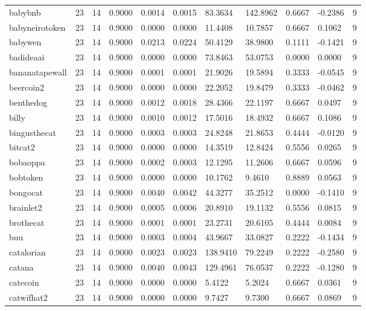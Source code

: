 \begin{table}[htbp]
\begin{tabular}{lllllllllll}
babybnb & 23 & 14 & 0.9000 & 0.0014 & 0.0015 & 83.3634 & 142.8962 & 0.6667 & -0.2386 & 9 \\
babyneirotoken & 23 & 14 & 0.9000 & 0.0000 & 0.0000 & 11.4408 & 10.7857 & 0.6667 & 0.1062 & 9 \\
babywen & 23 & 14 & 0.9000 & 0.0213 & 0.0224 & 50.4129 & 38.9800 & 0.1111 & -0.1421 & 9 \\
badideaai & 23 & 14 & 0.9000 & 0.0000 & 0.0000 & 73.8463 & 53.0753 & 0.0000 & 0.0000 & 9 \\
bananatapewall & 23 & 14 & 0.9000 & 0.0001 & 0.0001 & 21.9026 & 19.5894 & 0.3333 & -0.0545 & 9 \\
beercoin2 & 23 & 14 & 0.9000 & 0.0000 & 0.0000 & 22.2052 & 19.8479 & 0.3333 & -0.0462 & 9 \\
benthedog & 23 & 14 & 0.9000 & 0.0012 & 0.0018 & 28.4366 & 22.1197 & 0.6667 & 0.0497 & 9 \\
billy & 23 & 14 & 0.9000 & 0.0010 & 0.0012 & 17.5016 & 18.4932 & 0.6667 & 0.1086 & 9 \\
bingusthecat & 23 & 14 & 0.9000 & 0.0003 & 0.0003 & 24.8248 & 21.8653 & 0.4444 & -0.0120 & 9 \\
bitcat2 & 23 & 14 & 0.9000 & 0.0000 & 0.0000 & 14.3519 & 12.8424 & 0.5556 & 0.0265 & 9 \\
bobaoppa & 23 & 14 & 0.9000 & 0.0002 & 0.0003 & 12.1295 & 11.2606 & 0.6667 & 0.0596 & 9 \\
bobtoken & 23 & 14 & 0.9000 & 0.0000 & 0.0000 & 10.1762 & 9.4610 & 0.8889 & 0.0563 & 9 \\
bongocat & 23 & 14 & 0.9000 & 0.0040 & 0.0042 & 44.3277 & 35.2512 & 0.0000 & -0.1410 & 9 \\
brainlet2 & 23 & 14 & 0.9000 & 0.0005 & 0.0006 & 20.8910 & 19.1132 & 0.5556 & 0.0815 & 9 \\
brothecat & 23 & 14 & 0.9000 & 0.0001 & 0.0001 & 23.2731 & 20.6105 & 0.4444 & 0.0084 & 9 \\
buu & 23 & 14 & 0.9000 & 0.0003 & 0.0004 & 43.9667 & 33.0827 & 0.2222 & -0.1434 & 9 \\
catalorian & 23 & 14 & 0.9000 & 0.0023 & 0.0023 & 138.9410 & 79.2249 & 0.2222 & -0.2580 & 9 \\
catana & 23 & 14 & 0.9000 & 0.0040 & 0.0043 & 129.4961 & 76.0537 & 0.2222 & -0.1280 & 9 \\
catecoin & 23 & 14 & 0.9000 & 0.0000 & 0.0000 & 5.4122 & 5.2024 & 0.6667 & 0.0361 & 9 \\
catwifhat2 & 23 & 14 & 0.9000 & 0.0000 & 0.0000 & 9.7427 & 9.7300 & 0.6667 & 0.0869 & 9 \\

\end{tabular}
\end{table}
